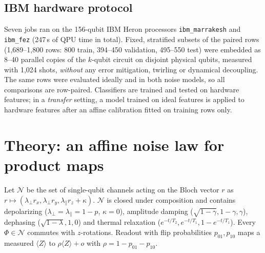 \documentclass[conference,compsoc]{IEEEtran}
\newcommand{\ev}[1]{\langle #1\rangle}
\begin{document}
\subsection{IBM hardware protocol}
Seven jobs ran on the 156-qubit IBM Heron processors \texttt{ibm\_marrakesh} and \texttt{ibm\_fez} (247\,s of QPU time in total). Fixed, stratified subsets of the paired rows (1,689--1,800 rows: 800 train, 394--450 validation, 495--550 test) were embedded as 8--40 parallel copies of the $k$-qubit circuit on disjoint physical qubits, measured with 1,024 shots, \emph{without} any error mitigation, twirling or dynamical decoupling. The same rows were evaluated ideally and in both noise models, so all comparisons are row-paired. Classifiers are trained and tested on hardware features; in a \emph{transfer} setting, a model trained on ideal features is applied to hardware features after an affine calibration fitted on training rows only.

\section{Theory: an affine noise law for product maps}
Let $\mathcal{N}$ be the set of single-qubit channels acting on the Bloch vector $r$ as $r\mapsto(\lambda_\perp r_x,\lambda_\perp r_y,\lambda_\parallel r_z+\kappa)$. $\mathcal{N}$ is closed under composition and contains depolarizing ($\lambda_\perp{=}\lambda_\parallel{=}1{-}p$, $\kappa{=}0$), amplitude damping ($\sqrt{1-\gamma},1-\gamma,\gamma$), dephasing ($\sqrt{1-\lambda},1,0$) and thermal relaxation ($e^{-t/T_2},e^{-t/T_1},1-e^{-t/T_1}$). Every $\Phi\in\mathcal{N}$ commutes with $z$-rotations. Readout with flip probabilities $p_{01},p_{10}$ maps a measured $\ev{Z}$ to $\rho\ev{Z}+o$ with $\rho=1-p_{01}-p_{10}$.
\end{document}
